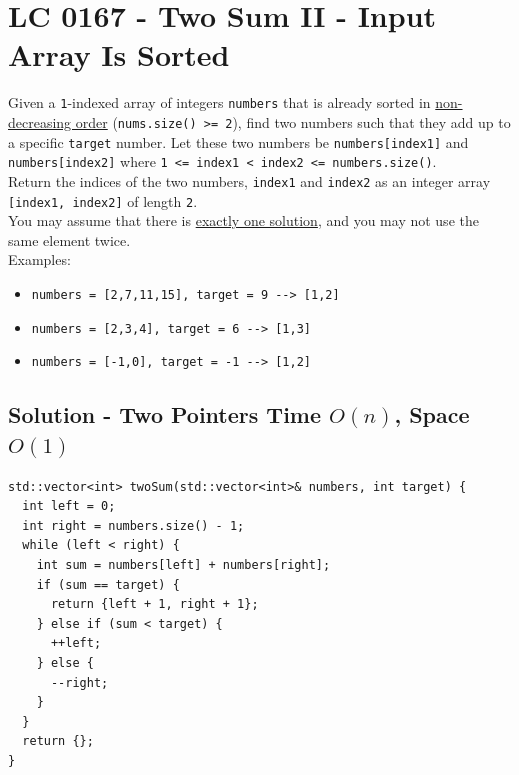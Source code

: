 \section{LC 0167 - Two Sum II - Input Array Is Sorted}\label{lc0167}
Given a {\colorbox{CodeBackground}{\lstinline|1|}}-indexed array of integers {\colorbox{CodeBackground}{\lstinline|numbers|}} that is already sorted in \ul{non-decreasing order} ({\colorbox{CodeBackground}{\lstinline|nums.size() >= 2|}}), find two numbers such that they add up to a specific {\colorbox{CodeBackground}{\lstinline|target|}} number. Let these two numbers be {\colorbox{CodeBackground}{\lstinline|numbers[index1]|}} and {\colorbox{CodeBackground}{\lstinline|numbers[index2]|}} where {\colorbox{CodeBackground}{\lstinline|1 <= index1 < index2 <= numbers.size()|}}. \\

Return the indices of the two numbers, {\colorbox{CodeBackground}{\lstinline|index1|}} and {\colorbox{CodeBackground}{\lstinline|index2|}} as an integer array {\colorbox{CodeBackground}{\lstinline|[index1, index2]|}} of length {\colorbox{CodeBackground}{\lstinline|2|}}.\\

You may assume that there is \ul{exactly one solution}, and you may not use the same element twice.\\

Examples:
\begin{itemize}
	\item {\colorbox{CodeBackground}{\lstinline|numbers = [2,7,11,15], target = 9 --> [1,2]|}}
	\item {\colorbox{CodeBackground}{\lstinline|numbers = [2,3,4], target = 6 --> [1,3]|}}
	\item {\colorbox{CodeBackground}{\lstinline|numbers = [-1,0], target = -1 --> [1,2]|}}
\end{itemize}

\subsection*{Solution - Two Pointers {\scriptsize\color{gray}\Coffeecup\hspace{1mm}Time $O(n)$, Space $O(1)$}}
\begin{lstlisting}
std::vector<int> twoSum(std::vector<int>& numbers, int target) {
  int left = 0;
  int right = numbers.size() - 1;
  while (left < right) {
    int sum = numbers[left] + numbers[right];
    if (sum == target) {
      return {left + 1, right + 1};
    } else if (sum < target) {
      ++left;
    } else {
      --right;
    }
  }
  return {};
}
\end{lstlisting}

